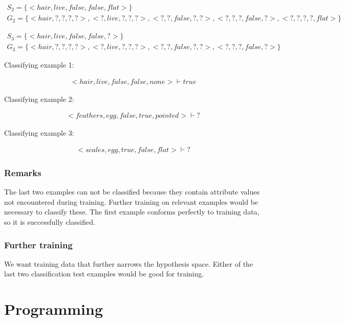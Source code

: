 \documentclass[paper=a4, fontsize=11pt]{scrartcl} %
\numberwithin{equation}{section} %
\numberwithin{figure}{section} %
\numberwithin{table}{section} %
\begin{document}
\begin{gather*}
    S_2 = \{<hair, live, false, false, flat>\} \\
    G_2 = \{<hair, ?, ?, ?, ?>, <?, live, ?, ?, ?>, <?, ?, false, ?, ?>, <?, ?, ?, false, ?>, <?, ?, ?, ?, flat>\}
\end{gather*}

\begin{gather*}
    S_3 = \{<hair, live, false, false, ?>\} \\
    G_3 = \{<hair, ?, ?, ?, ?>, <?, live, ?, ?, ?>, <?, ?, false, ?, ?>, <?, ?, ?, false, ?>\}
\end{gather*}

Classifying example 1:

\begin{gather*}
    <hair, live, false, false, none> \vdash true
\end{gather*}

Classifying example 2:

\begin{gather*}
    <feathers, egg, false, true, pointed> \vdash ?
\end{gather*}

Classifying example 3:

\begin{gather*}
    <scales, egg, true, false, flat> \vdash ?
\end{gather*}

\subsubsection{Remarks}

The last two examples can not be classified because they contain attribute values not encountered during training.
Further training on relevant examples would be necessary to classify these.
The first example conforms perfectly to training data, so it is successfully classified.

\subsubsection{Further training}

We want training data that further narrows the hypothesis space.
Either of the last two classification test examples would be good for training.

\section{Programming}
\end{document}
